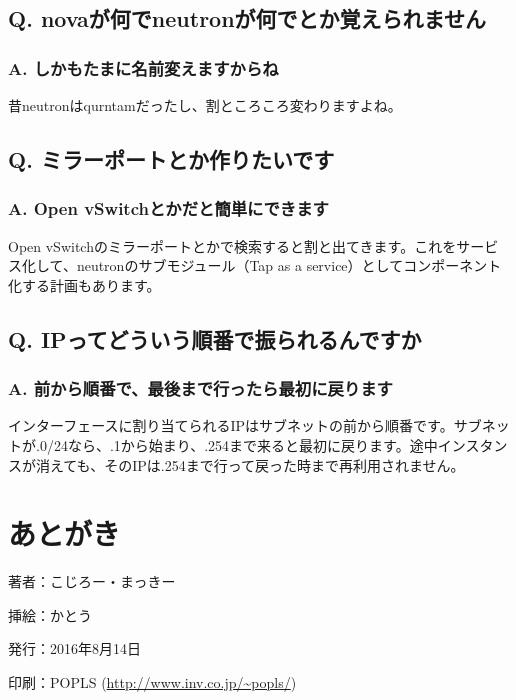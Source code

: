 \documentclass[9pt,b5paper,tombo,openany]{jsbook}
\begin{document}
\section*{Q. novaが何でneutronが何でとか覚えられません}
\subsection*{A. しかもたまに名前変えますからね}
昔neutronはqurntamだったし、割ところころ変わりますよね。

\section*{Q. ミラーポートとか作りたいです}
\subsection*{A. Open vSwitchとかだと簡単にできます}
Open vSwitchのミラーポートとかで検索すると割と出てきます。これをサービス化して、neutronのサブモジュール（Tap as a service）としてコンポーネント化する計画もあります。

\section*{Q. IPってどういう順番で振られるんですか}
\subsection*{A. 前から順番で、最後まで行ったら最初に戻ります}
インターフェースに割り当てられるIPはサブネットの前から順番です。サブネットが.0/24なら、.1から始まり、.254まで来ると最初に戻ります。途中インスタンスが消えても、そのIPは.254まで行って戻った時まで再利用されません。

\chapter{あとがき}

\newpage

\thispagestyle{empty}
\begin{flushright}
	\begin{minipage}{0.5\hsize}
		\begin{description}
			\item{著者：}こじろー・まっきー
			\item{挿絵：}かとう
			\item{発行：}2016年8月14日
			\item{印刷：}POPLS (\url{http://www.inv.co.jp/~popls/})
		\end{description}
	\end{minipage}
\end{flushright}
\end{document}
